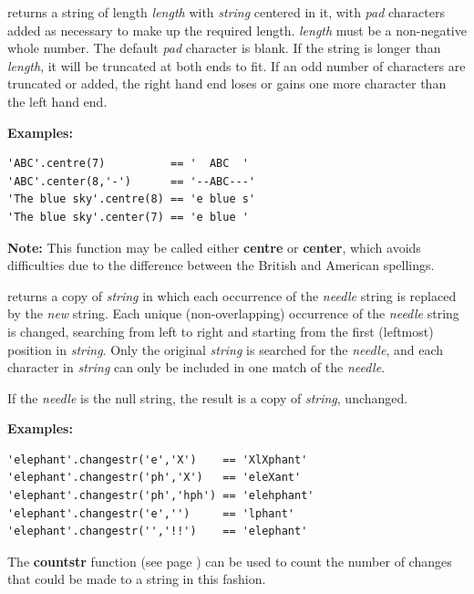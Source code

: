 \begin{description}
returns a string of length \emph{length} with \emph{string}
centered in it, with \emph{pad} characters added as necessary to
make up the required length.
\emph{length} must be a non-negative whole number.
The default \emph{pad} character is blank.
If the string is longer than \emph{length}, it will be truncated at
both ends to fit.
If an odd number of characters are truncated or added, the right hand
end loses or gains one more character than the left hand end.
 
\textbf{Examples:}
\begin{lstlisting}
'ABC'.centre(7)          == '  ABC  '
'ABC'.center(8,'-')      == '--ABC---'
'The blue sky'.centre(8) == 'e blue s'
'The blue sky'.center(7) == 'e blue '
\end{lstlisting}
\textbf{Note: }This function may be called either \textbf{centre} or \textbf{center},
which avoids difficulties due to the difference between the British and
American spellings.
\item[changestr(needle, new)]\label{refchastr}

returns a copy of \emph{string} in which each occurrence of the
\emph{needle} string is replaced by the \emph{new} string.
Each unique (non-overlapping) occurrence of the \emph{needle} string
is changed, searching from left to right and starting from the first
(leftmost) position in \emph{string}.
Only the original \emph{string} is searched for the
\emph{needle}, and each character in \emph{string} can only be
included in one match of the \emph{needle}.
 
If the \emph{needle} is the null string, the result is a copy of
\emph{string}, unchanged.
 
\textbf{Examples:}
\begin{lstlisting}
'elephant'.changestr('e','X')    == 'XlXphant'
'elephant'.changestr('ph','X')   == 'eleXant'
'elephant'.changestr('ph','hph') == 'elehphant'
'elephant'.changestr('e','')     == 'lphant'
'elephant'.changestr('','!!')    == 'elephant'
\end{lstlisting}
 The  \textbf{countstr} function (see page \pageref{refcoustr})  can be used to
count the number of changes that could be made to a string in this
fashion.
\item[compare(target [,pad{]})]\label{refcompar}


\end{description}
